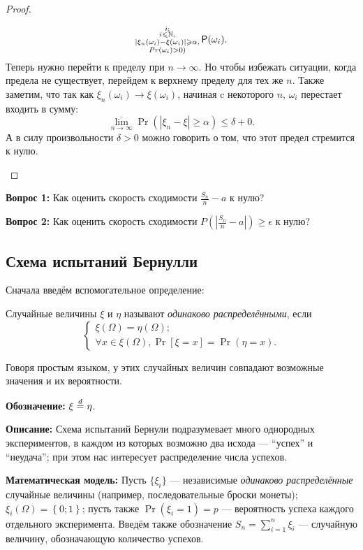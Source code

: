 \begin{proof}
\begin{itemize}
\begin{multline*}
{			\substack {
			i:\\
			i\leqslant\mathbb{N}, \\
		    \left|\xi_n(\omega_i) - \xi(\omega_i) \right| \geqslant\alpha,\\ Pr(\omega_i) > 0)
				}
			} \operatorname{\mathsf{P}}(\omega_i).  
			\end{multline*}
		Теперь нужно перейти к пределу при \(n \to \infty.\) Но чтобы избежать ситуации, когда предела не существует, перейдем к верхнему пределу для тех же $ n $. Также заметим, что так как \(\xi_n(\omega_i) \to \xi(\omega_i)\), начиная c некоторого $ n $, $ \omega_i $ перестает входить в сумму:  
		\[
			\overline{\lim_{n \to \infty}}\Pr(\left|\xi_n - \xi\right| \geq \alpha) \leq \delta + 0.
		\]
		А в силу произвольности \(\delta > 0\) можно говорить о том, что этот предел стремится к нулю.
	\end{itemize}
\end{proof}
\textbf{Вопрос 1:} Как оценить скорость сходимости $\frac{S_n}{n} - a$ к нулю?

\textbf{Вопрос 2:} Как оценить скорость сходимости $P\left(\left|\frac{S_n}{n} - a\right|\right) \geq \epsilon$ к нулю?

\subsection{Схема испытаний Бернулли}

Сначала введём вспомогательное определение:

\begin{definition}
    Случайные величины $\xi$ и $\eta$ называют \emph{одинаково распределёнными}, если 
    \[
        \begin{cases}
            \xi(\Omega) = \eta(\Omega); \\
            \forall x \in \xi(\Omega), \Pr[\xi = x] = \Pr(\eta = x).
        \end{cases}
    \]

    Говоря простым языком, у этих случайных величин совпадают возможные значения и их вероятности.

    \textbf{Обозначение:} $\xi \overset{d}{=} \eta$.
\end{definition}

\textbf{Описание:} Схема испытаний Бернули подразумевает много однородных экспериментов, в каждом из которых возможно два исхода --- ``успех'' и ``неудача''; при этом нас интересует распределение числа успехов.

\textbf{Математическая модель:} Пусть $\{\xi_i\}$ --- независимые \emph{одинаково распределённые} случайные величины (например, последовательные броски монеты); $\xi_i(\Omega) = \left\{ 0; 1 \right\}$; пусть также $\Pr(\xi_i = 1) = p$ --- вероятность успеха каждого отдельного эксперимента. Введём также обозначение $S_n = \sum\limits_{i = 1}^n \xi_i$ --- случайную величину, обозначающую количество успехов.

